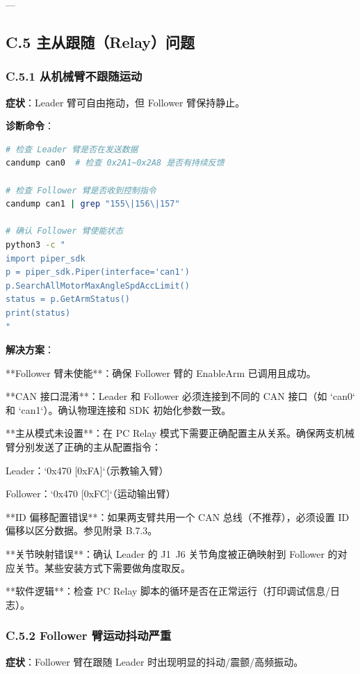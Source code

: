 \documentclass[UTF8,a4paper,11pt]{ctexart}
\begin{document}
{---

\subsection{C.5 主从跟随（Relay）问题}

\subsubsection{C.5.1 从机械臂不跟随运动}

\textbf{症状}：Leader 臂可自由拖动，但 Follower 臂保持静止。

\textbf{诊断命令}：
\begin{lstlisting}[language=bash]
# 检查 Leader 臂是否在发送数据
candump can0  # 检查 0x2A1~0x2A8 是否有持续反馈

# 检查 Follower 臂是否收到控制指令
candump can1 | grep "155\|156\|157"

# 确认 Follower 臂使能状态
python3 -c "
import piper_sdk
p = piper_sdk.Piper(interface='can1')
p.SearchAllMotorMaxAngleSpdAccLimit()
status = p.GetArmStatus()
print(status)
"
\end{lstlisting}

\textbf{解决方案}：
\item[1] **Follower 臂未使能**：确保 Follower 臂的 EnableArm 已调用且成功。
\item[2] **CAN 接口混淆**：Leader 和 Follower 必须连接到不同的 CAN 接口（如 `can0` 和 `can1`）。确认物理连接和 SDK 初始化参数一致。
\item[3] **主从模式未设置**：在 PC Relay 模式下需要正确配置主从关系。确保两支机械臂分别发送了正确的主从配置指令：
\item Leader：`0x470 [0xFA]`（示教输入臂）
\item Follower：`0x470 [0xFC]`（运动输出臂）
\item[4] **ID 偏移配置错误**：如果两支臂共用一个 CAN 总线（不推荐），必须设置 ID 偏移以区分数据。参见附录 B.7.3。
\item[5] **关节映射错误**：确认 Leader 的 J1~J6 关节角度被正确映射到 Follower 的对应关节。某些安装方式下需要做角度取反。
\item[6] **软件逻辑**：检查 PC Relay 脚本的循环是否在正常运行（打印调试信息/日志）。

\subsubsection{C.5.2 Follower 臂运动抖动严重}

\textbf{症状}：Follower 臂在跟随 Leader 时出现明显的抖动/震颤/高频振动。

}
\end{document}
